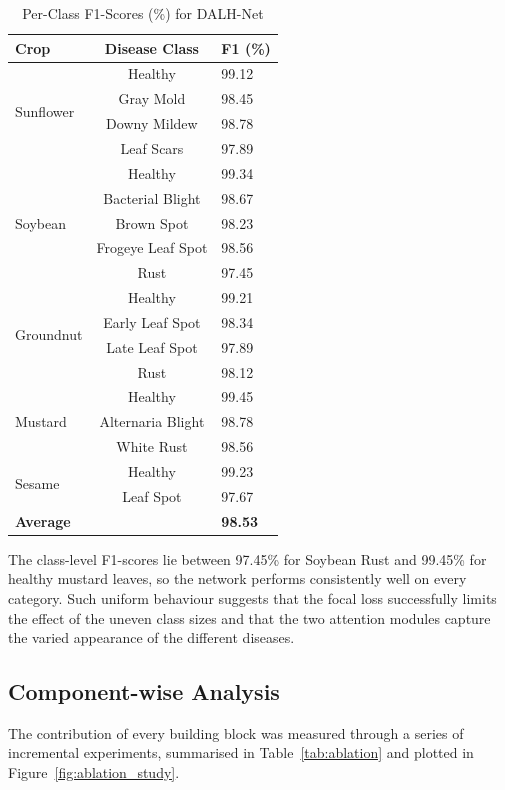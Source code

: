 \documentclass[default, iicol]{sn-jnl}
\theoremstyle{thmstyleone}%
\theoremstyle{thmstyletwo}%
\theoremstyle{thmstylethree}%
\begin{document}
\begin{table}[htbp]
\centering
\caption{Per-Class F1-Scores (\%) for DALH-Net}
\label{tab:perclass}
\begin{tabular}{l|c|l}
\toprule
\textbf{Crop} & \textbf{Disease Class} & \textbf{F1 (\%)} \\
\midrule
\multirow{4}{*}{Sunflower} & Healthy & 99.12 \\
& Gray Mold & 98.45 \\
& Downy Mildew & 98.78 \\
& Leaf Scars & 97.89 \\
\midrule
\multirow{5}{*}{Soybean} & Healthy & 99.34 \\
& Bacterial Blight & 98.67 \\
& Brown Spot & 98.23 \\
& Frogeye Leaf Spot & 98.56 \\
& Rust & 97.45 \\
\midrule
\multirow{4}{*}{Groundnut} & Healthy & 99.21 \\
& Early Leaf Spot & 98.34 \\
& Late Leaf Spot & 97.89 \\
& Rust & 98.12 \\
\midrule
\multirow{3}{*}{Mustard} & Healthy & 99.45 \\
& Alternaria Blight & 98.78 \\
& White Rust & 98.56 \\
\midrule
\multirow{2}{*}{Sesame} & Healthy & 99.23 \\
& Leaf Spot & 97.67 \\
\midrule
\multicolumn{2}{l}{\textbf{Average}} & \textbf{98.53} \\
\bottomrule
\end{tabular}
\end{table}

The class-level F1-scores lie between 97.45\% for Soybean Rust and 99.45\% for healthy mustard leaves, so the network performs consistently well on every category. Such uniform behaviour suggests that the focal loss successfully limits the effect of the uneven class sizes and that the two attention modules capture the varied appearance of the different diseases.

\subsection{Component-wise Analysis}

The contribution of every building block was measured through a series of incremental experiments, summarised in Table~\ref{tab:ablation} and plotted in Figure~\ref{fig:ablation_study}.
\end{document}
